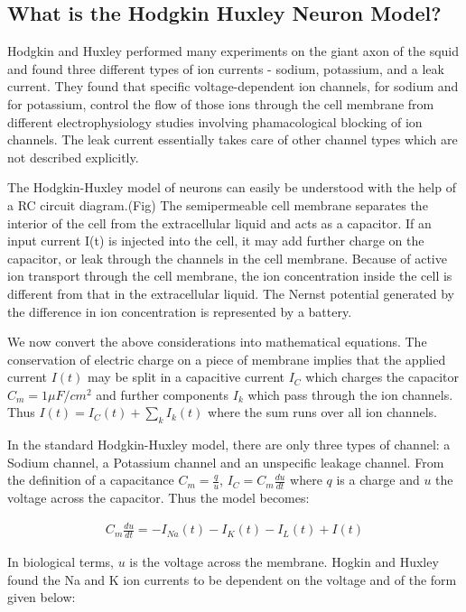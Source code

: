 \documentclass[10pt,letterpaper]{article}
\begin{document}
\subsection*{What is the Hodgkin Huxley Neuron Model?}

Hodgkin and Huxley performed many experiments on the giant axon of the squid and found three different types of ion currents - sodium, potassium, and a leak current. They found that specific voltage-dependent ion channels, for sodium and for potassium, control the flow of those ions through the cell membrane from different electrophysiology studies involving phamacological blocking of ion channels. The leak current essentially takes care of other channel types which are not described explicitly. 

The Hodgkin-Huxley model of neurons can easily be understood with the help of a RC circuit diagram.(Fig) The semipermeable cell membrane separates the interior of the cell from the extracellular liquid and acts as a capacitor. If an input current I(t) is injected into the cell, it may add further charge on the capacitor, or leak through the channels in the cell membrane. Because of active ion transport through the cell membrane, the ion concentration inside the cell is different from that in the extracellular liquid. The Nernst potential generated by the difference in ion concentration is represented by a battery.

We now convert the above considerations into mathematical equations. The conservation of electric charge on a piece of membrane implies that the applied current $I(t)$ may be split in a capacitive current $I_C$ which charges the capacitor $C_m = 1 \mu F/cm^2$ and further components $I_k$ which pass through the ion channels. Thus $I(t) = I_C(t) + \sum_kI_k(t)$ where the sum runs over all ion channels. 

In the standard Hodgkin-Huxley model, there are only three types of channel: a Sodium channel, a Potassium channel and an unspecific leakage channel. From the definition of a capacitance $C_m=\frac{q}{u}$, $I_C=C_m\frac{du}{dt}$ where $q$ is a charge and $u$ the voltage across the capacitor. Thus the model becomes:

\begin{eqnarray}\label{d3_1}C_m\frac{du}{dt}=−I_{Na}(t)−I_{K}(t)−I_{L}(𝑡)+I(t)\end{eqnarray}

In biological terms, $u$ is the voltage across the membrane. Hogkin and Huxley found the Na and K ion currents to be dependent on the voltage and of the form given below:
\end{document}
